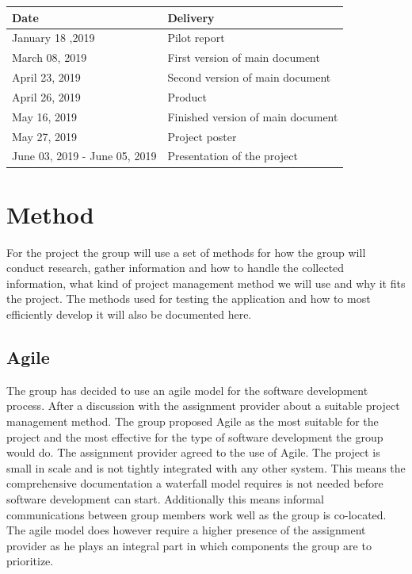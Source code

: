 \begin{tabu} to 1.2\textwidth { | X[l] | X[c] | }
    \hline
    \textbf{Date} & \textbf{Delivery} \\
    \hline
    January 18 ,2019 & Pilot report \\
    \hline
    March 08, 2019 & First version of main document \\
    \hline
    April 23, 2019 & Second version of main document \\
    \hline
    April 26, 2019 & Product \\
    \hline
    May 16, 2019 & Finished version of main document \\
    \hline
    May 27, 2019 & Project poster \\
    \hline
   June 03, 2019 - June 05, 2019 & Presentation of the project \\
    \hline
\end{tabu}
    
\section{Method}
For the project the group will use a set of methods for how the group will conduct research, gather information and how to handle the collected information, what kind of project management method we will use and why it fits the project. The methods used for testing the application and how to most efficiently develop it will also be documented here. 

\subsection{Agile}
The group has decided to use an agile model for the software development process. After a discussion with the assignment provider about a suitable project management method. The group proposed Agile as the most suitable for the project and the most effective for the type of software development the group would do. The assignment provider agreed to the use of Agile.  
The project is small in scale and is not tightly integrated with any other system. This means the comprehensive documentation a waterfall model requires is not needed before software development can start.  Additionally this means informal communications between group members work well as the group is co-located.
The agile model does however require a higher presence of the assignment provider as he plays an integral part in which components the group are to prioritize.

